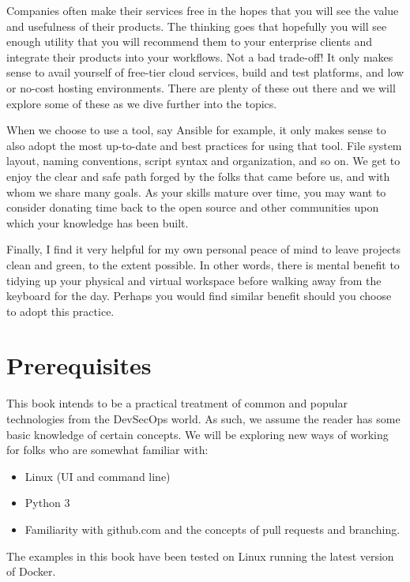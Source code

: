 \justify
Companies often make their services free in the hopes that you will see the value and usefulness of their products. The thinking goes that hopefully you will see enough utility that you will recommend them to your enterprise clients and integrate their products into your workflows. Not a bad trade-off! It only makes sense to avail yourself of free-tier cloud services, build and test platforms, and low or no-cost hosting environments. There are plenty of these out there and we will explore some of these as we dive further into the topics.

\justify
When we choose to use a tool, say Ansible for example, it only makes sense to also adopt the most up-to-date and best practices for using that tool. File system layout, naming conventions, script syntax and organization, and so on. We get to enjoy the clear and safe path forged by the folks that came before us, and with whom we share many goals. As your skills mature over time, you may want to consider donating time back to the open source and other communities upon which your knowledge has been built.

\justify
Finally, I find it very helpful for my own personal peace of mind to leave projects clean and green, to the extent possible. In other words, there is mental benefit to tidying up your physical and virtual workspace before walking away from the keyboard for the day. Perhaps you would find similar benefit should you choose to adopt this practice.

\section{Prerequisites}

\justify
This book intends to be a practical treatment of common and popular technologies
from the DevSecOps world. As such, we assume the reader has some basic knowledge
of certain concepts. We will be exploring new ways
of working for folks who are somewhat familiar with:

\begin{itemize}
\item
  Linux (UI and command line)
\item Python 3
\item
  Familiarity with github.com and the concepts of pull requests and branching.
\end{itemize}

\justify
The examples in this book have been tested on Linux running the latest
version of Docker.

